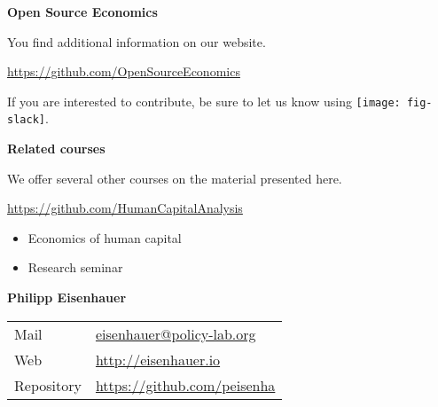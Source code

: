 \begin{frame}
	\textbf{Open Source Economics}\vspace{0.3cm}

You find additional information on our website.

\begin{center}
\url{https://github.com/OpenSourceEconomics}
\end{center}

If you are interested to contribute, be sure to let us know using \texttt{[image: fig-slack]}.

\end{frame}
\begin{frame}
	\textbf{Related courses}\vspace{0.3cm}

We offer several other courses on the material presented here.

	\begin{center}
	\url{https://github.com/HumanCapitalAnalysis}
	\end{center}


	\begin{itemize}\setlength\itemsep{1em}
	\item Economics of human capital
	\item Research seminar
	\end{itemize}

\end{frame}
\begin{frame}
\textbf{Philipp Eisenhauer}\\\vspace{0.5cm}
\begin{tabular}{ll}
Mail		& \href{mailto:eisenhauer@policy-lab.org}{eisenhauer@policy-lab.org}\\
Web     	& \url{http://eisenhauer.io} \\
Repository  & \url{https://github.com/peisenha}\\
\end{tabular}
\end{frame}
